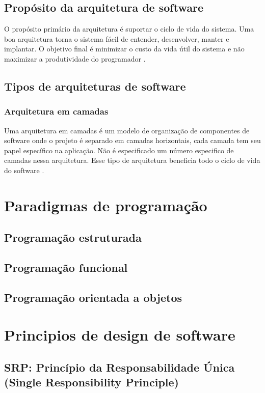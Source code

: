     \subsection{Propósito da arquitetura de software}
        \par O propósito primário da arquitetura é suportar o ciclo de vida do sistema. Uma boa arquitetura torna o sistema fácil de entender, desenvolver, manter e implantar. O objetivo final é minimizar o custo da vida útil do sistema e não maximizar a produtividade do programador \cite{livro:martin:cleanarch}.


    \subsection{Tipos de arquiteturas de software}
        \subsubsection{Arquitetura em camadas}
            \par Uma arquitetura em camadas é um modelo de organização de componentes de software onde o projeto é separado em camadas horizontais, cada camada tem seu papel específico na aplicação. Não é especificado um número especifico de camadas nessa arquitetura. Esse tipo de arquitetura beneficia todo o ciclo de vida do software \cite{artigo:bueno:2021}.

\section{Paradigmas de programação}
    \subsection{Programação estruturada}
    \subsection{Programação funcional}
    \subsection{Programação orientada a objetos}

\section{Principios de design de software}
    \subsection{SRP: Princípio da Responsabilidade Única (Single Responsibility Principle)}
